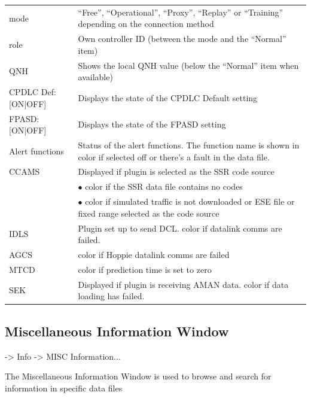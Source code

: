 \documentclass[a4paper,oneside,11pt]{memoir}
\begin{document}
\begin{longtable}{p{2.5cm} p{10cm}}
    mode                & “Free”, “Operational”, “Proxy”, “Replay” or “Training” depending on the connection method \\
    role                & Own controller ID (between the mode and the “Normal” item)\\
    QNH                 & Shows the local QNH value (below the “Normal” item when available)\\
    CPDLC Def: [ON|OFF] & Displays the state of the CPDLC Default setting\\
    FPASD: [ON|OFF]     & Displays the state of the FPASD setting \\
    Alert functions     & Status of the alert functions. The function name is shown in {Warning} color if selected off or there’s a fault in the data file.\\
    CCAMS               & Displayed if plugin is selected as the SSR code source\\
                        & $\bullet$ {Urgency} color if the SSR data file contains no codes\\
                        & $\bullet$ {Warning} color if simulated traffic is not downloaded or ESE file or fixed range selected as the code source\\
    IDLS                & Plugin set up to send DCL. {Warning} color if datalink comms are failed.\\
    AGCS                & {Warning} color if Hoppie datalink comms are failed\\
    MTCD                & {Warning} color if prediction time is set to zero    \\
    SEK                 & Displayed if plugin is receiving AMAN data. {Warning} color if data loading has failed.\\
\end{longtable}

\subsection{Miscellaneous Information Window}
\label{win:minfw}

 -> Info -> MISC Information...

\bigskip


The Miscellaneous Information Window is used to browse and search for information in specific data files
\end{document}
